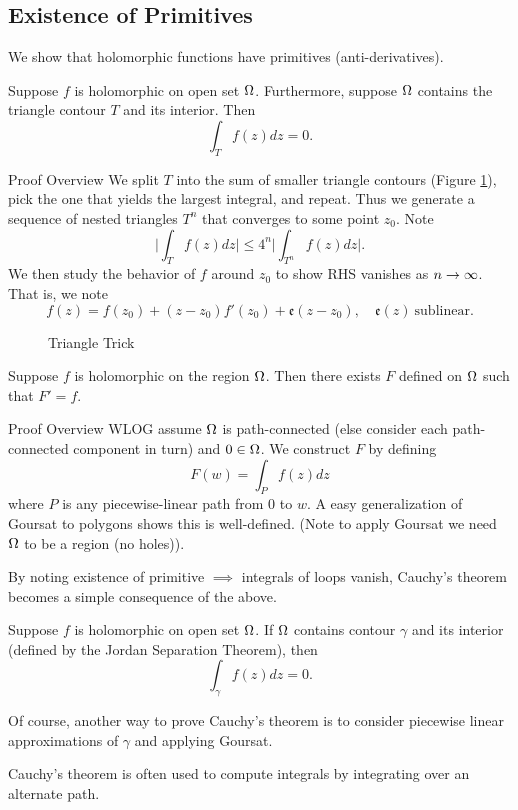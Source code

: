 \subsection{Existence of Primitives}
We show that holomorphic functions have primitives (anti-derivatives).
\begin{lem}[Goursat]
    Suppose $f$ is holomorphic on open set $\Omega$. Furthermore, suppose $\Omega$ contains the triangle contour $T$ and its interior. Then
    \[
        \int_T f(z) dz = 0.
    \]
\end{lem}
\begin{details}{Proof Overview}
    We split $T$ into the sum of smaller triangle contours (Figure \ref{fig:triangle_trick}), pick the one that yields the largest integral, and repeat. Thus we generate a sequence of nested triangles $T^n$ that converges to some point $z_0$. Note
    \[
        \Big| \int_T f(z) dz \Big| \leq 4^n \Big| \int_{T^n} f(z) dz \Big|.
    \]
    We then study the behavior of $f$ around $z_0$ to show RHS vanishes as $n \rightarrow \infty$. That is, we note
    \[
        f(z) = f(z_0) + (z-z_0)f'(z_0) + \mathfrak e(z-z_0), \quad \mathfrak e(z) \ \text{sublinear.}
    \]
\end{details}
\begin{figure}[ht]
    \centering
    \caption{Triangle Trick}
    \label{fig:triangle_trick}
\end{figure}
\begin{thm}
    Suppose $f$ is holomorphic on the region $\Omega$. Then there exists $F$ defined on $\Omega$ such that $F' = f$.
\end{thm}
\begin{details}{Proof Overview}
    WLOG assume $\Omega$ is path-connected (else consider each path-connected component in turn) and $0 \in \Omega$. We construct $F$ by defining
    \[
        F(w) = \int_P f(z)dz
    \]
    where $P$ is any piecewise-linear path from $0$ to $w$. A easy generalization of Goursat to polygons shows this is well-defined. (Note to apply Goursat we need $\Omega$ to be a region (no holes)).
\end{details}

By noting existence of primitive $\implies$ integrals of loops vanish, Cauchy's theorem becomes a simple consequence of the above.
\begin{cor}
    Suppose $f$ is holomorphic on open set $\Omega$. If $\Omega$ contains contour $\gamma$ and its interior (defined by the Jordan Separation Theorem), then
    \[
        \int_\gamma f(z) dz = 0.
    \]
\end{cor}
Of course, another way to prove Cauchy's theorem is to consider piecewise linear approximations of $\gamma$ and applying Goursat.
\begin{remark}
    Cauchy's theorem is often used to compute integrals by integrating over an alternate path.
\end{remark}
